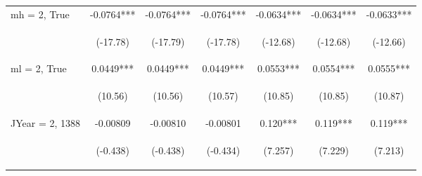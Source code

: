 \documentclass[]{article}
\begin{document}
\begin{center}
\begin{tabular}{lcccccc}
mh = 2, True & -0.0764*** & -0.0764*** & -0.0764*** & -0.0634*** & -0.0634*** & -0.0633*** \\
\vspace{4pt} & \begin{footnotesize}(-17.78)\end{footnotesize} & \begin{footnotesize}(-17.79)\end{footnotesize} & \begin{footnotesize}(-17.78)\end{footnotesize} & \begin{footnotesize}(-12.68)\end{footnotesize} & \begin{footnotesize}(-12.68)\end{footnotesize} & \begin{footnotesize}(-12.66)\end{footnotesize} \\
ml = 2, True & 0.0449*** & 0.0449*** & 0.0449*** & 0.0553*** & 0.0554*** & 0.0555*** \\
\vspace{4pt} & \begin{footnotesize}(10.56)\end{footnotesize} & \begin{footnotesize}(10.56)\end{footnotesize} & \begin{footnotesize}(10.57)\end{footnotesize} & \begin{footnotesize}(10.85)\end{footnotesize} & \begin{footnotesize}(10.85)\end{footnotesize} & \begin{footnotesize}(10.87)\end{footnotesize} \\
JYear = 2, 1388 & -0.00809 & -0.00810 & -0.00801 & 0.120*** & 0.119*** & 0.119*** \\
\vspace{4pt} & \begin{footnotesize}(-0.438)\end{footnotesize} & \begin{footnotesize}(-0.438)\end{footnotesize} & \begin{footnotesize}(-0.434)\end{footnotesize} & \begin{footnotesize}(7.257)\end{footnotesize} & \begin{footnotesize}(7.229)\end{footnotesize} & \begin{footnotesize}(7.213)\end{footnotesize} \\

\end{tabular}
\end{center}
\end{document}
